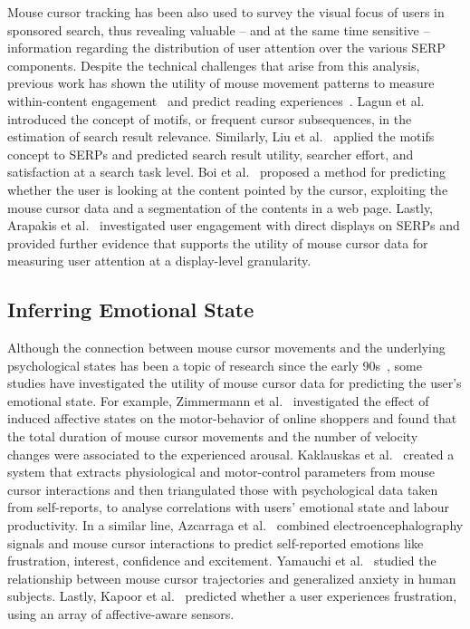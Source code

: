 \documentclass[sn-mathphys, pdflatex]{sn-jnl}
\begin{document}
Mouse cursor tracking has been also used to survey the visual focus of users in sponsored search,
thus revealing valuable -- and at the same time sensitive -- information
regarding the distribution of user attention over the various SERP components.
Despite the technical challenges that arise from this analysis,
previous work has shown the utility of mouse movement patterns
to measure within-content engagement~\cite{Arapakis14_news}
and predict reading experiences~\cite{Arapakis14_gestures, Hauger11}.
Lagun et al.~\cite{Lagun14_motifs} introduced the concept of motifs,
or frequent cursor subsequences, in the estimation of search result relevance.
Similarly, Liu et al.~\cite{Liu15_opinions} applied the motifs concept to SERPs
and predicted search result utility, searcher effort, and satisfaction at a search task level.
Boi et al.~\cite{Boi2016} proposed a method for predicting whether the user is looking at the content pointed by the cursor,
exploiting the mouse cursor data and a segmentation of the contents in a web page.
Lastly, Arapakis et al.~\cite{Arapakis16_dds, Arapakis20_ppa}
investigated user engagement with direct displays on SERPs
and provided further evidence that supports the utility of mouse cursor data
for measuring user attention at a display-level granularity.

\subsection{Inferring Emotional State}
\label{sec:emotion}

Although the connection between mouse cursor movements and the underlying psychological states has been a topic of research
since the early 90s~\cite{Accot97_fitts, Card87_mouse},
some studies have investigated the utility of mouse cursor data for predicting the user's emotional state.
For example, Zimmermann et al.~\cite{Zimmermann2003} investigated the effect of induced affective states
on the motor-behavior of online shoppers and found that the total duration of mouse cursor movements
and the number of velocity changes were associated to the experienced arousal.
Kaklauskas et al.~\cite{Kaklauskas2009}
created a system that extracts physiological and motor-control parameters
from mouse cursor interactions and then triangulated those with psychological data taken from self-reports,
to analyse correlations with users' emotional state and labour productivity.
In a similar line, Azcarraga et al.~\cite{Azcarraga12_brain} combined electroencephalography signals and mouse cursor interactions
to predict self-reported emotions like frustration, interest, confidence and excitement.
Yamauchi et al.~\cite{Yamauchi13_anxiety} studied the relationship between mouse cursor trajectories and generalized anxiety in human subjects.
Lastly, Kapoor et al.~\cite{Kapoor07_frustration} predicted whether a user experiences frustration, using an array of affective-aware sensors.
\end{document}
